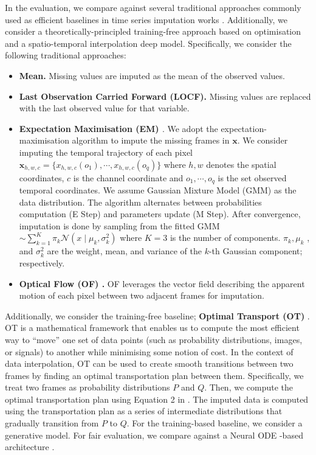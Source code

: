 \documentclass[10pt, conference, compsocconf]{IEEEtran}
\def\update#1{#1}
\begin{document}
In the evaluation, we compare against \update{several traditional approaches commonly used as efficient baselines in time series imputation works \cite{du2024tsi, ma2020transfer}. Additionally, we consider a theoretically-principled training-free approach based on optimisation and a spatio-temporal interpolation deep model. Specifically, we consider the following traditional approaches:}

\begin{itemize}
    \item \update{\textbf{Mean.} Missing values are imputed as the mean of the observed values.}
    \item \update{\textbf{Last Observation Carried Forward (LOCF).} Missing values are replaced with the last observed value for that variable.}
    \item \update{\textbf{Expectation Maximisation (EM) \cite{dempster1977maximum}}. We adopt the expectation-maximisation algorithm to impute the missing frames in $\mathbf{x}$. We consider imputing the temporal trajectory of each pixel $\mathbf{x}_{h,w,c} = \{x_{h,w,c}(o_1), \cdots, x_{h,w,c}(o_q)\}$ where $h,w$ denotes the spatial coordinates, $c$ is the channel coordinate and $o_1, \cdots , o_q$ is the set observed temporal coordinates. We assume Gaussian Mixture Model (GMM) as the data distribution. The algorithm alternates between probabilities computation (E Step) and parameters update (M Step). After convergence, imputation is done by sampling from the fitted GMM $\sim \sum_{k=1}^{K} \pi_k \mathcal{N}(x \mid \mu_k, \sigma_k^2)$ where $K = 3$ is the number of components. $\pi_k , \mu_k$ , and $\sigma_k^2$ are the weight, mean, and variance of the $k$-th Gaussian component; respectively.} 
    \item \update{\textbf{Optical Flow (OF) \cite{horn1981determining}.} OF leverages the vector field describing the apparent motion of each pixel between two adjacent
frames for imputation. }

    
\end{itemize}



\update{Additionally, we consider  the training-free baseline; \textbf{Optimal Transport (OT)} \cite{khamis2023earth}.} OT is a mathematical framework that enables us to compute the most efficient way to ``move'' one set of data points (such as probability distributions, images, or signals) to another while minimising some notion of cost. In the context of data interpolation, OT can be used to create smooth transitions between two frames by finding an optimal transportation plan between them. Specifically, we treat two frames as probability distributions $P$ and $Q$. Then, we compute the optimal transportation plan using Equation 2 in \cite{khamis2023earth}. \update{The imputed data is computed using the transportation plan as a series of intermediate distributions that gradually transition from $P$ to $Q$.} For the training-based baseline, we consider a generative model. For fair evaluation, we compare against a Neural ODE -based architecture \cite{kanaa2021simple}. 
\end{document}

